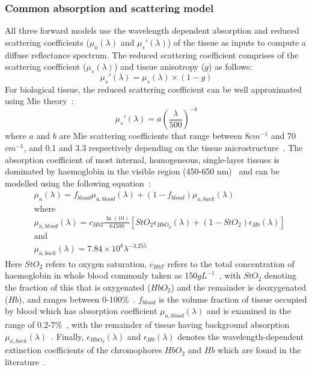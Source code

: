 \subsubsection{Common absorption and scattering model}\label{sec:opticproperties}
All three forward models use the wavelength dependent absorption and reduced scattering coefficients ($\mu_a(\lambda)$ and $\mu_s'(\lambda)$) of the tissue as inputs
to compute a
diffuse reflectance spectrum. 
The reduced scattering coefficient comprises of the scattering coefficient ($\mu_s(\lambda)$) and tissue anisotropy ($g$) as follows: 
\begin{equation}
    \mu_s'(\lambda) = \mu_s(\lambda) \times (1-g)
    \label{eq:reducedscattering}
\end{equation}
For biological tissue, the reduced scattering coefficient can be well approximated using Mie theory~\citep{Jacques2013}: 
\begin{equation}
    \mu_s'(\lambda) = a(\frac{\lambda}{500})^{-b}
    \label{eq:Mie}
\end{equation}
where $a$ and $b$ are Mie scattering coefficients that range between 8\textrm{$cm^{-1}$} and 70\textrm{$cm^{-1}$}, and 0.1 and 3.3 respectively depending on the tissue microstructure~\citep{Jacques2013}. 
The absorption coefficient of most internal, homogeneous, single-layer tissues is dominated by haemoglobin in the visible region (450-650 nm)~\citep{JacquesAbs} and can be modelled using the following equation~\citep{Yudovsky2009}: 
\begin{equation}
\begin{aligned}
    & \mu_a(\lambda) = f_{blood}\mu_{a, blood}(\lambda) + (1 - f_{blood})\mu_{a, back}(\lambda) \\
    & \textrm{where} \\
    & \mu_{a, blood}(\lambda) = c_{HbT}\frac{\ln(10)}{64500}[StO_2 \epsilon_{HbO_2}(\lambda) + (1 - StO_2)\epsilon_{Hb}(\lambda)] \\
    & \textrm{and} \\
    & \mu_{a, back}(\lambda) = 7.84\times10^8 \lambda^{-3.255}
\end{aligned}
\label{eq:mua}
\end{equation}
Here $StO_2$ refers to oxygen saturation, $c_{HbT}$ refers to the total concentration of haemoglobin in whole blood commonly taken as 150\textrm{$gL^{-1}$}~\citep{Prahl1999}, with $StO_2$ denoting the fraction of this that is oxygenated ($HbO_2$) and the remainder is deoxygenated ($Hb$), and ranges between 0-100\%~\citep{Yudovsky2009}. $f_{blood}$ is the volume fraction of tissue occupied by blood which has absorption coefficient $\mu_{a, blood}(\lambda)$ and is examined in the range of 0.2-7\%~\citep{Yudovsky2009}, with the remainder of tissue having background absorption $\mu_{a, back}(\lambda)$~\citep{Yudovsky2009}.
Finally, $\epsilon_{HbO_2}(\lambda)$ and $\epsilon_{Hb}(\lambda)$ denotes the wavelength-dependent extinction coefficients of the chromophores $HbO_2$ and $Hb$ which are found in the literature~\citep{Prahl1999}. 

